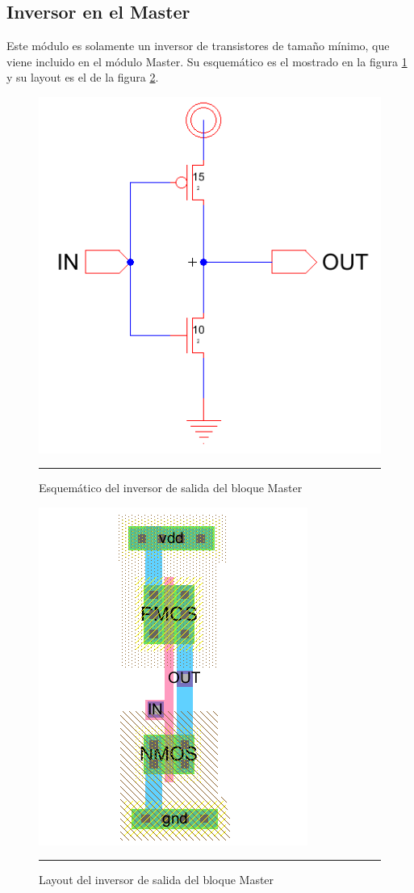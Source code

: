 \documentclass[12pt,a4paper]{article} %
\begin{document}
\subsection{Inversor en el Master}

Este módulo es solamente un inversor de transistores de tamaño mínimo, que viene incluido en el módulo Master. Su esquemático es el mostrado en la figura \ref{fig:Inv_s} y su layout es el de la figura \ref{fig:Inv_l}.

\begin{figure}[htbp]
  \centering
    \includegraphics[scale=0.45]{./Inv_s.png}
    \rule{35em}{0.5pt}
  \caption[Inv]{Esquemático del inversor de salida del bloque Master}
  \label{fig:Inv_s}
\end{figure}

\begin{figure}[htbp]
  \centering
    \includegraphics[scale=0.6]{./Inv_l.png}
    \rule{35em}{0.5pt}
  \caption[Inv]{Layout del inversor de salida del bloque Master}
  \label{fig:Inv_l}
\end{figure}
\end{document}
